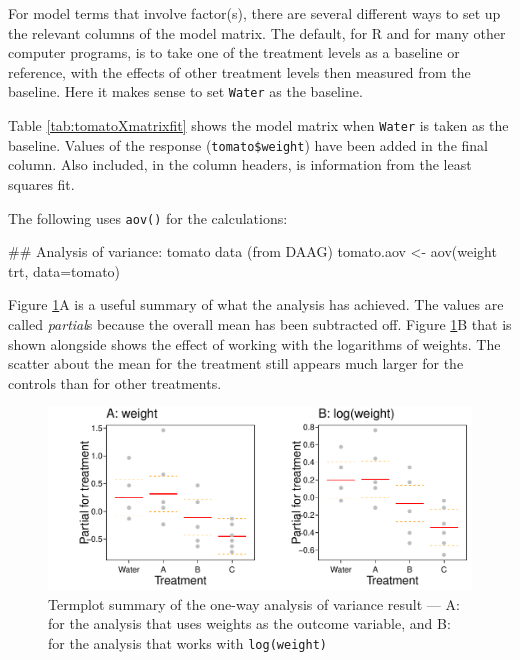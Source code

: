 \documentclass{tufte-book}\usepackage[]{graphicx}\usepackage[]{color}
\newcommand{\txtt}[1]{\texttt{#1}}
\begin{document}
For model terms that involve factor(s), there are several different
ways to set up the relevant columns of the model matrix.  The default,
for R and for many other computer programs, is to take one of the
treatment levels as a baseline or reference, with the effects of other
treatment levels then measured from the baseline.  Here it makes sense
to set \verb!Water! as the baseline.

Table \ref{tab:tomatoXmatrixfit} shows the model matrix when
\verb!Water! is taken as the baseline.  Values of the response
(\verb!tomato$weight!)  have been added in the final column. Also
included, in the column headers, is information from the least squares
fit.

The following uses \txtt{aov()} for the calculations:
\begin{Schunk}
\begin{Sinput}
## Analysis of variance: tomato data (from DAAG)
tomato.aov <- aov(weight ~ trt, data=tomato)
\end{Sinput}
\end{Schunk}

Figure \ref{fig:tomatoterm}A is a useful summary of what the analysis
has achieved. The values are called {\em partial}s because the
overall mean has been  subtracted off.  Figure \ref{fig:tomatoterm}B
that is shown alongside shows the effect of working with the logarithms
of weights.  The scatter  about the mean for the treatment still
appears much larger for the controls than for other treatments.
\begin{figure}
\begin{Schunk}


\centerline{\includegraphics[width=\textwidth]{figs/8-termplot-aovAB-1} }

\end{Schunk}
 \caption{Termplot summary of the one-way analysis of variance result ---
A: for the analysis that uses weights as the outcome variable, and
B: for the analysis that works with \txtt{log(weight)}}
\label{fig:tomatoterm}
\end{figure}
\end{document}
